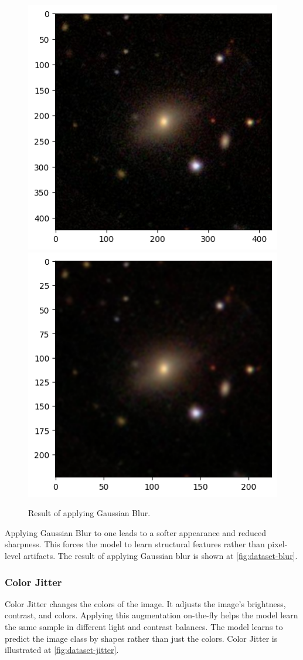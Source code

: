 \begin{figure}[htbp]\centering
  \centering
  \includegraphics[width=0.5\linewidth]{obrazky-figures/03-dataset/orig.png}\hfill
  \includegraphics[width=0.5\linewidth]{obrazky-figures/03-dataset/blur.png}
  \caption{Result of applying Gaussian Blur.}
  \label{fig:dataset-blur}
\end{figure}

Applying Gaussian Blur to one leads to a softer appearance and reduced sharpness. This forces the model to learn structural features rather than pixel-level artifacts. The result of applying Gaussian blur is shown at \autoref{fig:dataset-blur}.

\subsubsection*{Color Jitter}

Color Jitter changes the colors of the image. It adjusts the image's brightness, contrast, and colors. Applying this augmentation on-the-fly helps the model learn the same sample in different light and contrast balances. The model learns to predict the image class by shapes rather than just the colors. Color Jitter is illustrated at \autoref{fig:dataset-jitter}.

